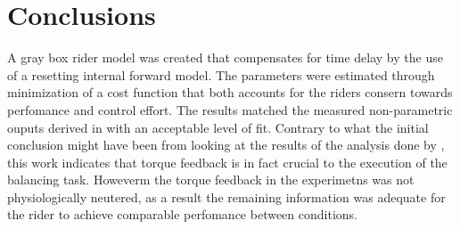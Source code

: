 \section{Conclusions}
A gray box rider model was created that compensates for time delay by the use of a resetting  internal forward model. The parameters were estimated through minimization of a cost function that both accounts for the riders consern towards perfomance and control effort. The results matched the measured non-parametric ouputs derived in \cite{dialynaseffect} with an acceptable level of fit. Contrary to what the initial conclusion might have been from looking at the results of the analysis done by \citet{dialynaseffect}, this work indicates that torque feedback is in fact crucial to the execution of the balancing task. Howeverm the torque feedback in the experimetns was not physiologically neutered, as a result  the remaining information was adequate for the rider to achieve comparable perfomance between conditions.


